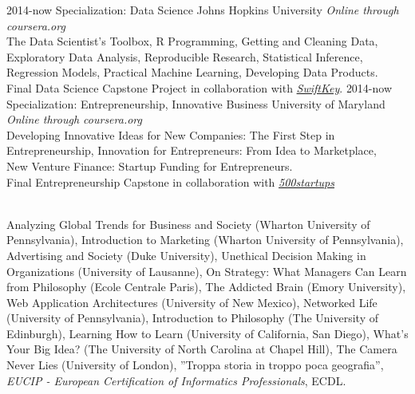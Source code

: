 \documentclass[]{friggeri-cv}
\begin{document}
\begin{entrylist}
  \entry
    {2014-now}
    {Specialization: Data Science}
    {Johns Hopkins University}
    {\emph{Online through coursera.org}\\
    The Data Scientist’s Toolbox, R Programming, Getting and Cleaning Data, \\Exploratory Data Analysis, Reproducible Research, Statistical Inference, \\Regression Models, Practical Machine Learning, Developing Data Products.\\
    Final Data Science Capstone Project in collaboration with \emph{\href{http://swiftkey.com/it/}{SwiftKey}}.
    }
\entry
    {2014-now}
    {Specialization: Entrepreneurship, Innovative Business}
    {University of Maryland}
    {\emph{Online through coursera.org}\\
    Developing Innovative Ideas for New Companies: The First Step in Entrepreneurship, Innovation for Entrepreneurs: From Idea to Marketplace,\\ New Venture Finance: Startup Funding for Entrepreneurs. \\
    Final Entrepreneurship Capstone in collaboration with \emph{\href{http://500.co/startups}{500startups}}
    }
\end{entrylist}\\

Analyzing Global Trends for Business and Society (Wharton University of Pennsylvania), Introduction to Marketing (Wharton University of Pennsylvania), Advertising and Society (Duke University), Unethical Decision Making in Organizations (University of Lausanne), On Strategy: What Managers Can Learn from Philosophy (Ecole Centrale Paris), The Addicted Brain (Emory University), Web Application Architectures (University of New Mexico), Networked Life (University of Pennsylvania), Introduction to Philosophy
(The University of Edinburgh), Learning How to Learn (University of California, San Diego), What's Your Big Idea? (The University of North Carolina at Chapel Hill), The Camera Never Lies (University of London), ''Troppa storia in troppo poca geografia'', \emph{EUCIP - European Certification of Informatics Professionals}, ECDL.
\end{document}
